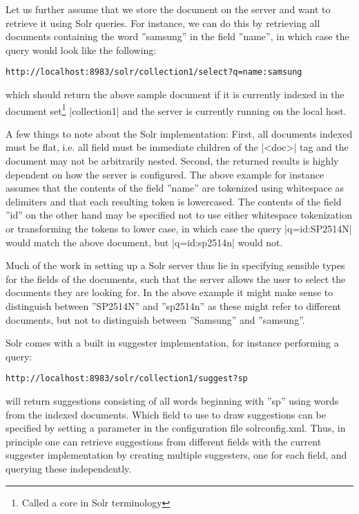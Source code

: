 Let us further assume that we store the document on the server and want to retrieve it using Solr queries. For instance, we can do this by retrieving all documents containing the word ''samsung'' in the field ''name'', in which case the query would look like the following:

\begin{verbatim}
http://localhost:8983/solr/collection1/select?q=name:samsung
\end{verbatim}

\noindent which should return the above sample document if it is currently indexed in the document set\footnote{Called a core in Solr terminology} |collection1| and the server is currently running on the local host.

A few things to note about the Solr implementation: First, all documents indexed must be flat, i.e. all  field must be immediate children of the |<doc>| tag and the document may not be arbitrarily nested. Second, the returned results is highly dependent on how the server is configured. The above example for instance assumes that the contents of the field ''name'' are tokenized using whitespace as delimiters and that each resulting token is lowercased. The contents of the field ''id'' on the other hand may be specified not to use either whitespace tokenization or transforming the tokens to lower case, in which case the query |q=id:SP2514N| would match the above document, but |q=id:sp2514n| would not.

Much of the work in setting up a Solr server thus lie in specifying sensible types for the fields of the documents, such that the server allows the user to select the documents they are looking for. In the above example it might make sense to distinguish between ''SP2514N'' and ''sp2514n'' as these might refer to different documents, but not to distinguish between ''Samsung'' and ''samsung''.

Solr comes with a built in suggester implementation, for instance performing a query:

\begin{verbatim}
http://localhost:8983/solr/collection1/suggest?sp
\end{verbatim}

\noindent will return suggestions consisting of all words beginning with ''sp'' using words from the indexed documents. Which field to use to draw suggestions can be specified by setting a parameter in the configuration file solrconfig.xml. Thus, in principle one can retrieve suggestions from different fields with the current suggester implementation by creating multiple suggesters, one for each field, and querying these independently.


